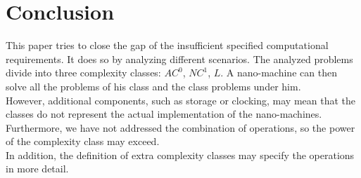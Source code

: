 \documentclass[10pt,sigconf]{acmart}
\begin{document}
\section{Conclusion}
This paper tries to close the gap of the insufficient specified computational requirements.
It does so by analyzing different scenarios. 
The analyzed problems divide into three complexity classes: $AC^0$, $NC^1$, $L$.
A nano-machine can then solve all the problems of his class and the class problems under him.\\
However, additional components, such as storage or clocking, may mean that the classes do not represent the actual implementation of the nano-machines.\\
Furthermore, we have not addressed the combination of operations, so the power of the complexity class may exceed.\\
In addition, the definition of extra complexity classes may specify the operations in more detail.








 
\end{document}
